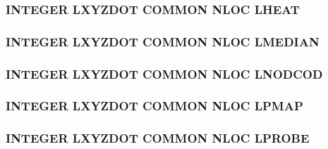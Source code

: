 \hypertarget{nloc_8com_a4a8137a1f2298c7fcb61b4f41bb3f2c9}{
\subsubsection[{L\-H\-E\-A\-T}]{\setlength{\rightskip}{0pt plus 5cm}I\-N\-T\-E\-G\-E\-R L\-X\-Y\-Z\-D\-O\-T C\-O\-M\-M\-O\-N N\-L\-O\-C L\-H\-E\-A\-T}}\label{nloc_8com_a4a8137a1f2298c7fcb61b4f41bb3f2c9}
\hypertarget{nloc_8com_a8d798cd68d415a92ae547f41860a401f}{
\subsubsection[{L\-M\-E\-D\-I\-A\-N}]{\setlength{\rightskip}{0pt plus 5cm}I\-N\-T\-E\-G\-E\-R L\-X\-Y\-Z\-D\-O\-T C\-O\-M\-M\-O\-N N\-L\-O\-C L\-M\-E\-D\-I\-A\-N}}\label{nloc_8com_a8d798cd68d415a92ae547f41860a401f}
\hypertarget{nloc_8com_ac60737f8a2639aca5962c9f2be2afe13}{
\subsubsection[{L\-N\-O\-D\-C\-O\-D}]{\setlength{\rightskip}{0pt plus 5cm}I\-N\-T\-E\-G\-E\-R L\-X\-Y\-Z\-D\-O\-T C\-O\-M\-M\-O\-N N\-L\-O\-C L\-N\-O\-D\-C\-O\-D}}\label{nloc_8com_ac60737f8a2639aca5962c9f2be2afe13}
\hypertarget{nloc_8com_aad3707d655f61ee00f44d0ffafa8ad6a}{
\subsubsection[{L\-P\-M\-A\-P}]{\setlength{\rightskip}{0pt plus 5cm}I\-N\-T\-E\-G\-E\-R L\-X\-Y\-Z\-D\-O\-T C\-O\-M\-M\-O\-N N\-L\-O\-C L\-P\-M\-A\-P}}\label{nloc_8com_aad3707d655f61ee00f44d0ffafa8ad6a}
\hypertarget{nloc_8com_a8e6118a4515655b3f08c2f37aa4eacda}{
\subsubsection[{L\-P\-R\-O\-B\-E}]{\setlength{\rightskip}{0pt plus 5cm}I\-N\-T\-E\-G\-E\-R L\-X\-Y\-Z\-D\-O\-T C\-O\-M\-M\-O\-N N\-L\-O\-C L\-P\-R\-O\-B\-E}}\label{nloc_8com_a8e6118a4515655b3f08c2f37aa4eacda}

